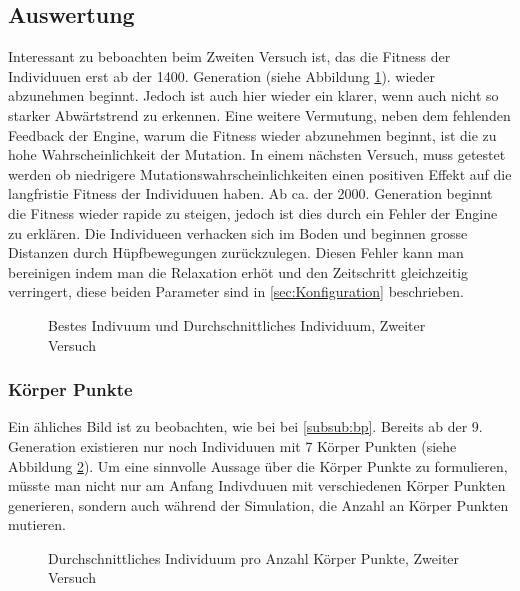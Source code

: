     \subsection{Auswertung}
      Interessant zu beboachten beim Zweiten Versuch ist, das die Fitness der Individuuen erst ab der 1400. Generation (siehe Abbildung \ref{fig:graphSecond}).
      wieder abzunehmen beginnt. Jedoch ist auch hier wieder ein klarer, wenn auch nicht so starker Abwärtstrend zu erkennen.
      Eine weitere Vermutung, neben dem fehlenden Feedback der Engine, warum die Fitness wieder abzunehmen beginnt,
      ist die zu hohe Wahrscheinlichkeit der Mutation. In einem nächsten Versuch, muss getestet werden ob niedrigere Mutationswahrscheinlichkeiten
      einen positiven Effekt auf die langfristie Fitness der Individuuen haben. Ab ca. der 2000. Generation beginnt die Fitness wieder rapide zu steigen,
      jedoch ist dies durch ein Fehler der Engine zu erklären. Die Individueen verhacken sich im Boden und beginnen grosse Distanzen durch Hüpfbewegungen zurückzulegen.
      Diesen Fehler kann man bereinigen indem man die Relaxation erhöt und den Zeitschritt gleichzeitig verringert, diese beiden Parameter sind in \ref{sec:Konfiguration} beschrieben.
        \begin{figure}
          
          \caption{Bestes Indivuum und Durchschnittliches Individuum, Zweiter Versuch}
          \label{fig:graphSecond}
        \end{figure}

    \subsubsection{Körper Punkte}
      Ein ähliches Bild ist zu beobachten, wie bei bei \ref{subsub:bp}.
      Bereits ab der 9. Generation existieren nur noch Individuuen mit 7 Körper Punkten (siehe Abbildung \ref{fig:graphBpSecond}).
      Um eine sinnvolle Aussage über die Körper Punkte zu formulieren, müsste man nicht nur am Anfang Indivduuen mit verschiedenen Körper Punkten generieren,
      sondern auch während der Simulation, die Anzahl an Körper Punkten mutieren.
    \begin{figure}
      
      \caption{Durchschnittliches Individuum pro Anzahl Körper Punkte, Zweiter Versuch}
      \label{fig:graphBpSecond}
    \end{figure}
